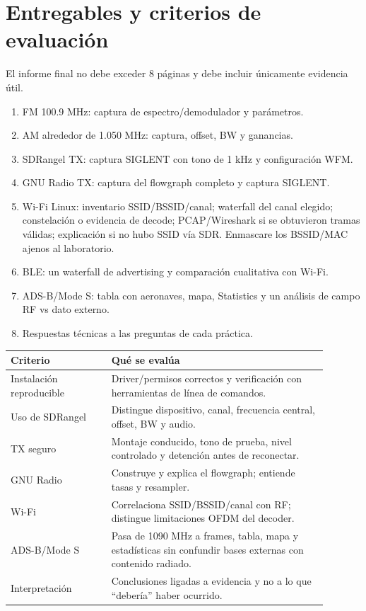 \section{Entregables y criterios de evaluación}

El informe final no debe exceder 8 páginas y debe incluir únicamente evidencia útil.

\begin{enumerate}
    \item FM 100.9 MHz: captura de espectro/demodulador y parámetros.
    \item AM alrededor de 1.050 MHz: captura, offset, BW y ganancias.
    \item SDRangel TX: captura SIGLENT con tono de 1 kHz y configuración WFM.
    \item GNU Radio TX: captura del flowgraph completo y captura SIGLENT.
    \item Wi-Fi Linux: inventario SSID/BSSID/canal; waterfall del canal elegido; constelación o evidencia de decode; PCAP/Wireshark si se obtuvieron tramas válidas; explicación si no hubo SSID vía SDR. Enmascare los BSSID/MAC ajenos al laboratorio.
    \item BLE: un waterfall de advertising y comparación cualitativa con Wi-Fi.
    \item ADS-B/Mode S: tabla con aeronaves, mapa, Statistics y un análisis de campo RF vs dato externo.
    \item Respuestas técnicas a las preguntas de cada práctica.
\end{enumerate}

\begin{longtable}{@{}p{0.29\linewidth}p{0.60\linewidth}@{}}
\toprule
\textbf{Criterio} & \textbf{Qué se evalúa} \\
\midrule
\endhead
Instalación reproducible & Driver/permisos correctos y verificación con herramientas de línea de comandos. \\
Uso de SDRangel & Distingue dispositivo, canal, frecuencia central, offset, BW y audio. \\
TX seguro & Montaje conducido, tono de prueba, nivel controlado y detención antes de reconectar. \\
GNU Radio & Construye y explica el flowgraph; entiende tasas y resampler. \\
Wi-Fi & Correlaciona SSID/BSSID/canal con RF; distingue limitaciones OFDM del decoder. \\
ADS-B/Mode S & Pasa de 1090 MHz a frames, tabla, mapa y estadísticas sin confundir bases externas con contenido radiado. \\
Interpretación & Conclusiones ligadas a evidencia y no a lo que ``debería'' haber ocurrido. \\
\bottomrule
\end{longtable}

